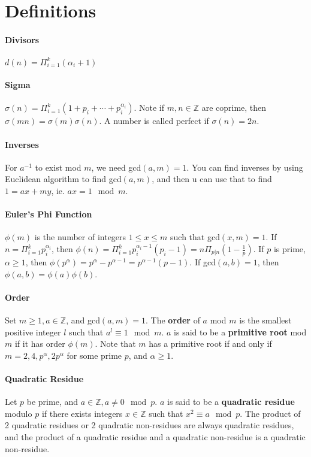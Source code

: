 \documentclass[10pt,letter]{article}
\theoremstyle{plain}
\theoremstyle{definition}
\begin{document}
\section{Definitions}
\paragraph{Divisors}
$d(n)=\Pi_{i=1}^k(\alpha_i+1)$ 
\paragraph{Sigma}
$\sigma(n)=\Pi_{i=1}^k(1+p_i+\cdots+p_i^{\alpha_i})$. Note if $m,n\in\mathbb{Z}$ are coprime, then $\sigma(mn)=\sigma(m)\sigma(n)$. A number is called perfect if $\sigma(n)=2n$. 
\paragraph{Inverses}
For $a^{-1}$ to exist mod $m$, we need gcd$(a,m)=1$. You can find inverses by using Euclidean algorithm to find gcd$(a,m)$, and then u can use that to find $1=ax+my$, ie. $ax=1\mod{m}$. 
\paragraph{Euler's Phi Function}
$\phi(m)$ is the number of integers $1\leq x\leq m$ such that gcd$(x,m)=1$. If $n=\Pi_{i=1}^kp_i^{\alpha_i}$, then $\phi(n)=\Pi_{i=1}^kp_i^{\alpha_i-1}(p_i-1)=n\Pi_{p|n}\left(1-\frac{1}{p}\right)$. If $p$ is prime, $\alpha\geq1$, then $\phi(p^\alpha)=p^\alpha-p^{\alpha-1}=p^{\alpha-1}(p-1)$. If gcd$(a,b)=1$, then $\phi(a,b)=\phi(a)\phi(b)$. 
\paragraph{Order}
Set $m\geq1,a\in\mathbb{Z}$, and gcd$(a,m)=1$. The \textbf{order} of $a$ mod $m$ is the smallest positive integer $l$ such that $a^l\equiv1\mod{m}$. $a$ is said to be a \textbf{primitive root} mod $m$ if it has order $\phi(m)$. Note that $m$ has a primitive root if and only if $m=2,4,p^\alpha,2p^\alpha$ for some prime $p$, and $\alpha\geq1$. 
\paragraph{Quadratic Residue}
Let $p$ be prime, and $a\in\mathbb{Z},a\neq0\mod{p}$. $a$ is said to be a \textbf{quadratic residue} modulo $p$ if there exists integers $x\in\mathbb{Z}$ such that $x^2\equiv a\mod{p}$. The product of 2 quadratic residues or 2 quadratic non-residues are always quadratic residues, and the product of a quadratic residue and a quadratic non-residue is a quadratic non-residue. 
\end{document}
